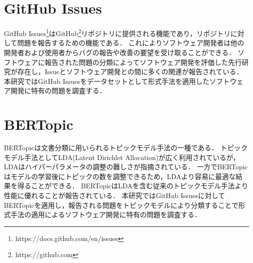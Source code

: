 \documentclass[main]{subfiles}
\begin{document}
\section{GitHub Issues}

GitHub Issues\footnote{https://docs.github.com/en/issues}はGitHub\footnote{https://github.com}リポジトリに提供される機能であり，リポジトリに対して問題を報告するための機能である．
これによりソフトウェア開発者は他の開発者および使用者からバグの報告や改善の要望を受け取ることができる．
ソフトウェアに報告された問題の分類によってソフトウェア開発を評価した先行研究が存在し\cite{hall:2001}，Issueとソフトウェア開発との間に多くの関連が報告されている\cite{bissyande:2013}．
本研究ではGitHub Issuesをデータセットとして形式手法を適用したソフトウェア開発に特有の問題を調査する．

\section{BERTopic}

BERTopicは文書分類に用いられるトピックモデル手法の一種である．
トピックモデル手法としてLDA(Latent Dirichlet Allocation)が広く利用されているが，LDAはハイパーパラメータの調整の難しさが指摘されている\cite{panichella:2021}．
一方でBERTopicはモデルの学習後にトピックの数を調整できるため，LDAより容易に最適な結果を得ることができる．
BERTopicはLDAを含む従来のトピックモデル手法より性能に優れることが報告されている\cite{egger:2022}．
本研究ではGitHub Issuesに対してBERTopicを適用し，報告される問題をトピックモデルにより分類することで形式手法の適用によるソフトウェア開発に特有の問題を調査する．
\end{document}
